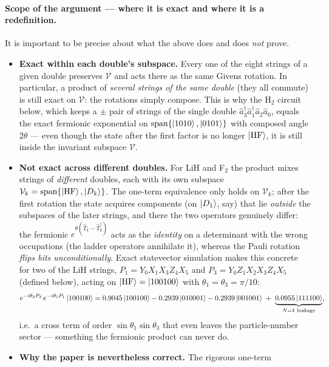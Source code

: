 \documentclass[11pt]{article}
\newcommand{\ad}[1]{\hat{a}^{\dagger}_{#1}}
\newcommand{\an}[1]{\hat{a}_{#1}}
\begin{document}
\paragraph{Scope of the argument --- where it is exact and where it is a
redefinition.} It is important to be precise about what the above does and
does \emph{not} prove.
\begin{itemize}
\item \textbf{Exact within each double's subspace.} Every one of the eight
  strings of a given double preserves $\mathcal{V}$ and acts there as the
  same Givens rotation. In particular, a product of \emph{several strings of
  the same double} (they all commute) is still exact on $\mathcal{V}$: the
  rotations simply compose. This is why the H$_2$ circuit below, which keeps
  a $\pm$ pair of strings of the single double $\ad3\ad1\an2\an0$, equals
  the exact fermionic exponential on
  $\mathrm{span}\{\ket{1010},\ket{0101}\}$ with composed angle $2\theta$ ---
  even though the state after the first factor is no longer $\ket{\rm HF}$,
  it is still inside the invariant subspace $\mathcal{V}$.
\item \textbf{Not exact across different doubles.} For LiH and F$_2$ the
  product mixes strings of \emph{different} doubles, each with its own
  subspace $\mathcal{V}_k=\mathrm{span}\{\ket{\rm HF},\ket{D_k}\}$. The
  one-term equivalence only holds on $\mathcal{V}_k$; after the first
  rotation the state acquires components (on $\ket{D_1}$, say) that lie
  \emph{outside} the subspaces of the later strings, and there the two
  operators genuinely differ: the fermionic
  $e^{\theta(\hat T_k-\hat T_k^\dagger)}$ acts as the \emph{identity} on a
  determinant with the wrong occupations (the ladder operators annihilate
  it), whereas the Pauli rotation \emph{flips bits unconditionally}. Exact
  statevector simulation makes this concrete for two of the LiH strings,
  $P_1=Y_0X_1X_3Z_4X_5$ and $P_3=Y_0Z_1X_2X_3Z_4X_5$ (defined below), acting
  on $\ket{\rm HF}=\ket{100100}$ with $\theta_1=\theta_3=\pi/10$:
  \begin{equation}
    e^{-i\theta_3 P_3}\,e^{-i\theta_1 P_1}\ket{100100}
    = 0.9045\ket{100100} - 0.2939\ket{010001} - 0.2939\ket{001001}
      \;+\; \underbrace{0.0955\ket{111100}}_{N=4\ \text{leakage}},
  \end{equation}
  i.e.\ a cross term of order $\sin\theta_1\sin\theta_3$ that even leaves
  the particle-number sector --- something the fermionic product can never
  do.
\item \textbf{Why the paper is nevertheless correct.} The rigorous one-term

\end{itemize}
\end{document}
